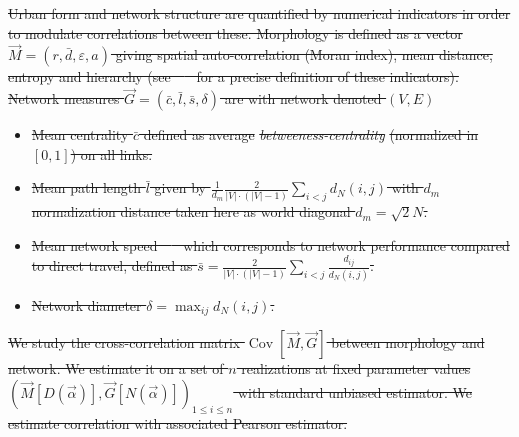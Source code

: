 \documentclass{bmcart}
\DeclareMathOperator{\Cov}{Cov}
\newcommand{\Covb}[2]{\ensuremath{\Cov\!\left[#1,#2\right]}}
\providecommand{\DIFdeltex}[1]{{\protect\color{red}\sout{#1}}}                      %
\providecommand{\DIFdel}[1]{\texorpdfstring{\DIFdeltex{#1}}{}} %
\begin{document}

\DIFdel{Urban form and network structure are quantified by numerical indicators in order to modulate correlations between these. Morphology is defined as a vector $\vec{M}=(r,\bar{d},\varepsilon,a)$ giving spatial auto-correlation (Moran index), mean distance, entropy and hierarchy (see~\mbox{%
\cite{le2015forme} }%
for a precise definition of these indicators). Network measures $\vec{G} = (\bar{c},\bar{l},\bar{s},\delta)$ are with network denoted $(V,E)$
}%
\begin{itemize}%
\item%
\DIFdel{Mean centrality $\bar{c}$ defined as average }\emph{\DIFdel{betweeness-centrality}} %
\DIFdel{(normalized in $[0,1]$) on all links.
}%
\item%
\DIFdel{Mean path length $\bar{l}$ given by $\frac{1}{d_m}\frac{2}{|V|\cdot (|V|-1)}\sum_{i<j}d_N(i,j)$ with $d_m$ normalization distance taken here as world diagonal $d_m=\sqrt{2}N$.
}%
\item%
\DIFdel{Mean network speed~\mbox{%
\cite{banos2012towards} }%
which corresponds to network performance compared to direct travel, defined as $\bar{s} = \frac{2}{|V|\cdot (|V|-1)}\sum_{i<j}{\frac{d_{ij}}{d_N(i,j)}}$.
}%
\item%
\DIFdel{Network diameter $\delta = \max_{ij}d_N(i,j)$.
}
\end{itemize}%


\DIFdel{We study the cross-correlation matrix $\Covb{\vec{M}}{\vec{G}}$ between morphology and network. We estimate it on a set of $n$ realizations at fixed parameter values $(\vec{M}\left[D(\vec{\alpha})\right],\vec{G}\left[N(\vec{\alpha})\right])_{1\leq i\leq n}$ with standard unbiased estimator. We estimate correlation with associated Pearson estimator. 
}%
\end{document}
